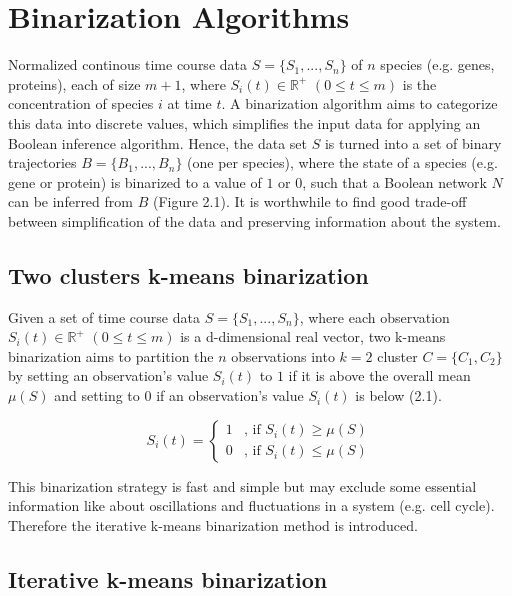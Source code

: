 \section{Binarization Algorithms}

Normalized continous time course data $S=\{S_{1}, ...,S_{n}\}$ of $n$ species (e.g. genes, proteins), each of size $m+1$, where $S_{i}(t)\in\mathbb{R^{+}}$ $(0\le t \le m)$ is the concentration of species $i$ at time $t$. A binarization algorithm aims to categorize this data into discrete values, which simplifies the input data for applying an Boolean inference algorithm. Hence, the data set $S$ is turned into a set of binary trajectories $B=\{B_{1},...,B_{n}\}$ (one per species), where the state of a species (e.g. gene or protein) is binarized to a value of $1$ or $0$, such that a Boolean network $N$ can be inferred from $B$ (Figure 2.1)\citep{Berestovsky.2013}. It is worthwhile to find good trade-off between simplification of the data and preserving information about the system.


\subsection*{Two clusters k-means binarization}
Given a set of time course data $S=\{S_{1}, ...,S_{n}\}$, where each observation $S_{i}(t)\in\mathbb{R^{+}}$ $(0\le t \le m)$ is a d-dimensional real vector, two k-means binarization aims to partition the $n$ observations into $k=2$ cluster $C=\{C_{1},C_{2}\}$ by setting an observation's value $S_{i}(t)$ to $1$ if it is above the overall mean $\mu(S)$ and setting to $0$ if an observation's value $S_{i}(t)$ is below (2.1).

\begin{equation}
S_{i}(t)=\begin{cases}
1 & \text{, if }S_{i}(t)\ge \mu (S)\\
0 & \text{, if }S_{i}(t)\le \mu (S)
\end{cases}
\end{equation}

\citep{MacQueen.1967} 

This binarization strategy is fast and simple but may exclude some essential information like about oscillations and fluctuations in a system (e.g. cell cycle). Therefore the iterative k-means binarization method is introduced.
\citep{Berestovsky.2013}



\subsection*{Iterative k-means binarization}

